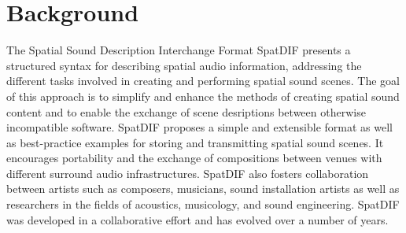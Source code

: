 \documentclass{article}
\title{\papertitle}
\begin{document}
\capstartfalse
\maketitle
\capstarttrue

\begin{abstract}
The development of SpatDIF, the Spatial Sound Description Interchange Format, continues with the implementation of concrete software tools.
In order to make SpatDIF usable in audio workflows, two types of code implementations are developed.
The first is the C/C++ software library `libspatdif', whose purpose is to provide a reference implementation of SpatDIF.
We show the class structure of this library and discuss its main components and how they embody the principles derived from the concepts and specifications of SpatDIF.
The second type of tool are specific implementations in audio programming environments, which demonstrate the methods and best-use practices for working with SpatDIF.
Two practical scenarios are shown in functional examples, demonstrating the use of externals in MaxMSP and Pure Data as well as the implementation of the same example in C++.
Finally, the article addresses the possible evolution of the syntax and further development of the software system for spatial sound description.

\end{abstract}


\section{Background}\label{sec:background}

The Spatial Sound Description Interchange Format SpatDIF presents a structured syntax for describing spatial audio information, addressing the different tasks involved in creating and performing spatial sound scenes.
The goal of this approach is to simplify and enhance the methods of creating spatial sound content and to enable the exchange of scene desriptions between otherwise incompatible software. 
SpatDIF proposes a simple and extensible format as well as best-practice examples for storing and transmitting spatial sound scenes. 
It encourages portability and the exchange of compositions between venues with different surround audio infrastructures. 
SpatDIF also fosters collaboration between artists such as composers, musicians, sound installation artists as well as researchers in the fields of acoustics, musicology, and sound engineering.
SpatDIF was developed in a collaborative effort and has evolved over a number of years.
\end{document}

